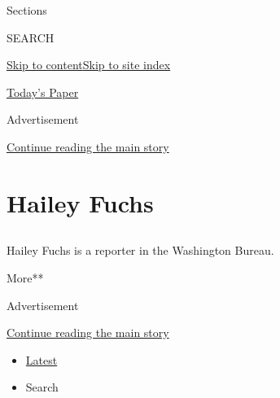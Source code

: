 Sections

SEARCH

\protect\hyperlink{site-content}{Skip to
content}\protect\hyperlink{site-index}{Skip to site index}

\href{https://myaccount.nytimes.com/auth/login?response_type=cookie\&client_id=vi}{}

\href{https://www.nytimes.com/section/todayspaper}{Today's Paper}

Advertisement

\protect\hyperlink{after-top}{Continue reading the main story}

\hypertarget{hailey-fuchs}{%
\section{Hailey Fuchs}\label{hailey-fuchs}}

\subsection{}

Hailey Fuchs is a reporter in the Washington Bureau.

More**

Advertisement

\protect\hyperlink{after-mid1}{Continue reading the main story}

\begin{itemize}
\tightlist
\item
  \protect\hyperlink{stream-panel}{Latest}
\item
  Search
\end{itemize}

